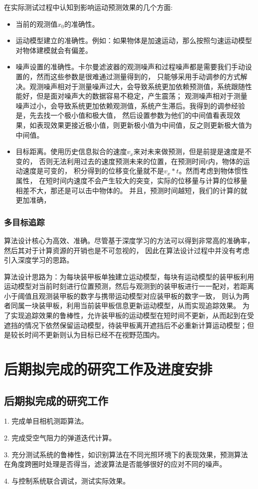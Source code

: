 在实际测试过程中认知到影响运动预测效果的几个方面:
\begin{itemize}[itemsep=2pt,topsep=0pt,parsep=0pt]
    \item 当前的观测值$x_0$的准确性。
    \item 运动模型建立的准确性。例如：如果物体是加速运动，那么按照匀速运动模型对物体建模就会有偏差。
    \item 噪声设置的准确性。卡尔曼滤波器的观测噪声和过程噪声都是需要我们手动设置的，然而这些参数是很难通过测量得到的，
    只能够采用手动调参的方式解决。观测噪声相对于测量噪声过大，会导致系统更加依赖预测值，系统跟随性能好，但是面对噪声大的数据容易不稳定，产生震荡；
    观测噪声相对于测量噪声过小，会导致系统更加依赖观测值，系统产生滞后。我得到的调参经验是，先去找一个极小值和极大值，
    然后设置参数为他们的中间值看表现效果，如表现效果更接近极小值，则更新极小值为中间值，反之则更新极大值为中间值。
    \item 目标距离。使用历史信息拟合的速度$v_x$来对未来做预测，但是前提是速度是不变的，
    否则无法利用过去的速度预测未来的位置，在预测时间$t$内，物体的运动速度是可变的，
    积分得到的位移变化量就不是$v_x*t$。然而考虑到物体惯性属性，
    在短时间内速度不会产生较大的突变，实际的位移量与计算的位移量相差不大，那还是可以击中物体的。
    并且，预测时间越短，我们的计算的就更加准确，
\end{itemize}

\subsubsection{多目标追踪}
算法设计核心为高效、准确。尽管基于深度学习的方法可以得到非常高的准确率，然后其对于计算资源的开销也是不可忽视的，
因此在算法设计过程中并没有考虑引入深度学习的思路。\par
算法设计思路为：为每块装甲板单独建立运动模型，每块有运动模型的装甲板利用运动模型对当前时刻进行位置预测，然后与观测到的装甲板进行一一配对，若距离小于阈值且观测装甲板的数字与携带运动模型对应装甲板的数字一致，
则认为两者同属一块装甲板，利用当前装甲板信息更新运动模型，从而实现追踪效果。
为了实现追踪效果的鲁棒性，允许装甲板的运动模型在短时间不更新，从而起到在受遮挡的情况下依然保留运动模型，待装甲板离开遮挡后不必重新计算运动模型；但是较长时间不更新则认为目标已经不在视野范围内。

\section{后期拟完成的研究工作及进度安排}
\subsection{后期拟完成的研究工作}
1. 完成单目相机测距算法。\par
2. 完成受空气阻力的弹道迭代计算。\par
3. 充分测试系统的鲁棒性，如识别算法在不同光照环境下的表现效果，预测算法在角度跨圈时处理是否得当，滤波算法是否能够很好的应对不同的噪声。\par
4. 与控制系统联合调试，测试实际效果。\par
